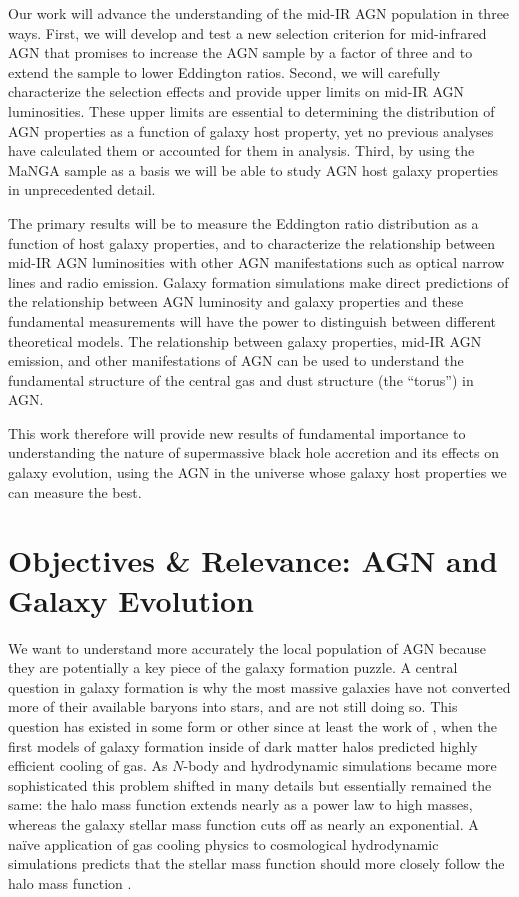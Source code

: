 \documentclass[12pt, preprint]{hacked-aastex}
\begin{document}
Our work will advance the understanding of the mid-IR AGN population
in three ways. First, we will develop and test a new selection
criterion for mid-infrared AGN that promises to increase the AGN
sample by a factor of three and to extend the sample to lower
Eddington ratios. Second, we will carefully characterize the selection
effects and provide upper limits on mid-IR AGN luminosities. These
upper limits are essential to determining the distribution of AGN
properties as a function of galaxy host property, yet no previous
analyses have calculated them or accounted for them in analysis.
Third, by using the MaNGA sample as a basis we will be able to study
AGN host galaxy properties in unprecedented detail.

The primary results will be to measure the Eddington ratio
distribution as a function of host galaxy properties, and to
characterize the relationship between mid-IR AGN luminosities with
other AGN manifestations such as optical narrow lines and radio
emission. Galaxy formation simulations make direct predictions of the
relationship between AGN luminosity and galaxy properties and these
fundamental measurements will have the power to distinguish between
different theoretical models. The relationship between galaxy
properties, mid-IR AGN emission, and other manifestations of AGN can
be used to understand the fundamental structure of the central gas and
dust structure (the ``torus'') in AGN.

This work therefore will provide new results of fundamental importance
to understanding the nature of supermassive black hole accretion and
its effects on galaxy evolution, using the AGN in the universe whose
galaxy host properties we can measure the best.

\section{Objectives \& Relevance: AGN and Galaxy Evolution}\label{sec:intro}

We want to understand more accurately the local population of AGN because
they are potentially a key piece of the galaxy formation puzzle.
A central question in galaxy formation is why the most massive
galaxies have not converted more of their available baryons into stars,
and are not still doing so. This question has existed in some form or 
other since at least the work of \cite{white78a}, when the first models 
of galaxy formation
inside of dark matter halos predicted highly efficient cooling of
gas. As $N$-body and hydrodynamic simulations became more sophisticated 
this problem shifted in many details but essentially remained the same: 
the halo mass function extends nearly as a power law to high masses, whereas 
the galaxy stellar mass function cuts off as nearly an exponential. 
A na\"ive application of gas cooling physics to cosmological hydrodynamic
simulations predicts that the stellar mass function should more closely follow the halo mass function \cite{benson03a, somerville15a}.
\end{document}
